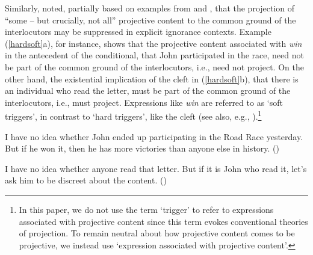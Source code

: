 \documentclass[11pt,fleqn]{article}
\newcommand{\6}{\mbox{$[\hspace*{-.6mm}[$}}
\newcommand{\9}{\mbox{$]\hspace*{-.6mm}]$}}
\def\infelic{{\leavevmode\llap{\#}}}
\begin{document}
Similarly, \citet[432]{simons01} noted, partially based on examples from \citealt{ccmg90} and \citealt{geurts94}, that the projection of ``some -- but crucially, not all'' projective content to the common ground of the interlocutors may be suppressed in explicit ignorance contexts. Example (\ref{hardsoft}a), for instance, shows that the projective content associated with {\em win} in the antecedent of the conditional, that John participated in the race, need not be part of the common ground of the interlocutors, i.e., need not project. On the other hand, the existential implication of the cleft in (\ref{hardsoft}b), that there is an individual who read the letter, must be part of the common ground of the interlocutors, i.e., must project. Expressions like {\em win} are referred to as `soft triggers', in contrast to `hard triggers', like the cleft (see also, e.g., \citealt{abusch10,abrusan2016}).\footnote{In this paper, we do not use the term `trigger' to refer to expressions associated with projective content since this term evokes conventional theories of projection. To remain neutral about how projective content comes to be projective, we instead use `expression associated with projective content'.}

\begin{exe}
\ex\label{hardsoft}
\begin{xlist}

\ex I have no idea whether John ended up participating in the Road Race yesterday. But if he won it, then he has more victories than anyone else in history. \hfill (\citealt[39]{abusch10})

\ex\infelic I have no idea whether anyone read that letter. But if it is John
who read it, let's ask him to be discreet about the content. \hfill (\citealt[40]{abusch10})

\end{xlist}
\end{exe}
\end{document}
